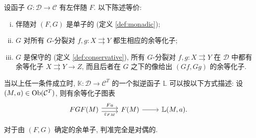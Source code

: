 \begin{theorem}[J.\ M.\ Beck]\label{prop:Beck}
	设函子 $G: \mathcal{D} \to \mathcal{C}$ 有左伴随 $F$. 以下陈述等价:
	\begin{enumerate}[(i)]
		\item 伴随对 $(F, G)$ 是单子的 (定义 \ref{def:monadic});
		\item $G$ 对所有 $G$-分裂对 $f, g: X \rightrightarrows Y$ 都生相应的余等化子;
		\item $G$ 是保守的 (定义 \ref{def:conservative}), 所有 $G$-分裂对 $f, g: X \rightrightarrows Y$ 在 $\mathcal{D}$ 中都有余等化子 $X \rightrightarrows Y \to Z$, 而且后者在 $G$ 之下的像给出 $(Gf, Gg)$ 的余等化子.
	\end{enumerate}

	当以上任一条件成立时, $\mathbb{K}: \mathcal{D} \to \mathcal{C}^T$ 的一个拟逆函子 $\mathbb{L}$ 可以按以下方式描述: 设 $(M, a) \in \operatorname{Ob}(\mathcal{C}^T)$, 则有余等化子图表
	\begin{equation}\label{eqn:Beck-aux1}\begin{tikzcd}
		FGF(M) \arrow[shift left, r, "Fa"] \arrow[shift right, r, "\varepsilon_{FM}"'] & F(M) \arrow[r] & \mathbb{L}(M, a).
	\end{tikzcd}\end{equation}

	对于由 $(F, G)$ 确定的余单子, 判准完全是对偶的.
\end{theorem}
